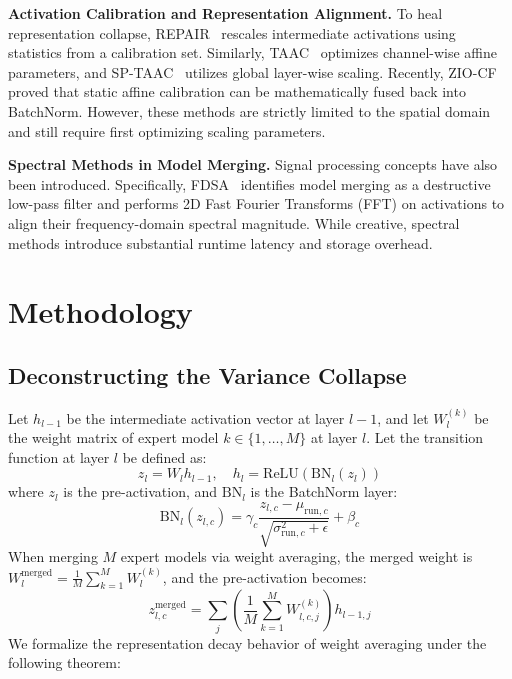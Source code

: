 \documentclass{article}
\theoremstyle{plain}
\theoremstyle{definition}
\theoremstyle{remark}
\begin{document}
\textbf{Activation Calibration and Representation Alignment.} To heal representation collapse, REPAIR~\cite{jordan22} rescales intermediate activations using statistics from a calibration set. Similarly, TAAC~\cite{taac2026} optimizes channel-wise affine parameters, and SP-TAAC~\cite{sptaac2026} utilizes global layer-wise scaling. Recently, ZIO-CF~\cite{ziocf2026} proved that static affine calibration can be mathematically fused back into BatchNorm. However, these methods are strictly limited to the spatial domain and still require first optimizing scaling parameters.

\textbf{Spectral Methods in Model Merging.} Signal processing concepts have also been introduced. Specifically, FDSA~\cite{fdsa2026} identifies model merging as a destructive low-pass filter and performs 2D Fast Fourier Transforms (FFT) on activations to align their frequency-domain spectral magnitude. While creative, spectral methods introduce substantial runtime latency and storage overhead.

\section{Methodology}
\label{sec:method}

\subsection{Deconstructing the Variance Collapse}
Let $h_{l-1}$ be the intermediate activation vector at layer $l-1$, and let $W_l^{(k)}$ be the weight matrix of expert model $k \in \{1, \dots, M\}$ at layer $l$. Let the transition function at layer $l$ be defined as:
\begin{equation}
z_l = W_l h_{l-1}, \quad h_l = \text{ReLU}(\text{BN}_l(z_l))
\end{equation}
where $z_l$ is the pre-activation, and $\text{BN}_l$ is the BatchNorm layer:
\begin{equation}
\text{BN}_l(z_{l,c}) = \gamma_c \frac{z_{l,c} - \mu_{\text{run}, c}}{\sqrt{\sigma_{\text{run}, c}^2 + \epsilon}} + \beta_c
\end{equation}
When merging $M$ expert models via weight averaging, the merged weight is $W_l^{\text{merged}} = \frac{1}{M}\sum_{k=1}^M W_l^{(k)}$, and the pre-activation becomes:
\begin{equation}
z_{l,c}^{\text{merged}} = \sum_j \left( \frac{1}{M}\sum_{k=1}^M W_{l,c,j}^{(k)} \right) h_{l-1, j}
\end{equation}
We formalize the representation decay behavior of weight averaging under the following theorem:
\end{document}
